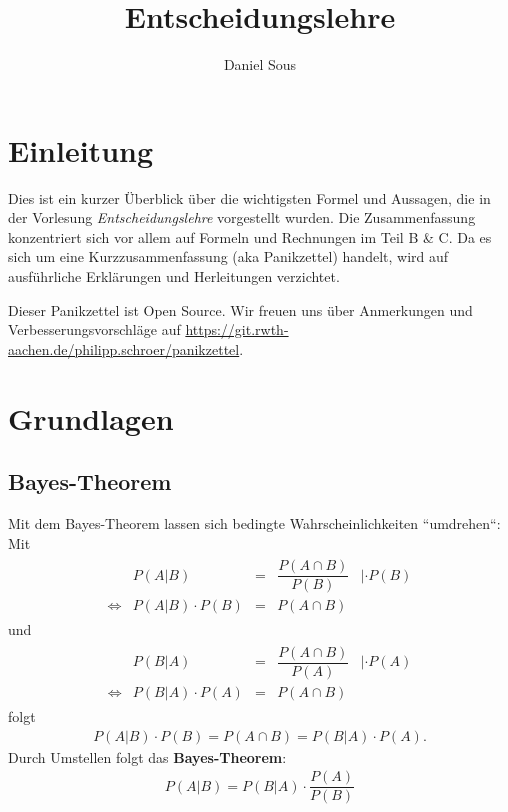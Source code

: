 \documentclass{panikzettel}
\title{Entscheidungslehre}
\author{Daniel Sous}
\begin{document}
\maketitle

\tableofcontents

\section{Einleitung}

Dies ist ein kurzer Überblick über die wichtigsten Formel und Aussagen, die in der Vorlesung \textit{Entscheidungslehre} \cite{vonNitzsch:skript} vorgestellt wurden. Die Zusammenfassung konzentriert sich vor allem auf Formeln und Rechnungen im Teil B \& C. Da es sich um eine Kurzzusammenfassung (aka Panikzettel) handelt, wird auf ausführliche Erklärungen und Herleitungen verzichtet.

Dieser Panikzettel ist Open Source.
Wir freuen uns über Anmerkungen und Verbesserungsvorschläge auf \url{https://git.rwth-aachen.de/philipp.schroer/panikzettel}.

\section{Grundlagen}

\subsection{Bayes-Theorem}
Mit dem Bayes-Theorem lassen sich bedingte Wahrscheinlichkeiten ``umdrehen``:\\
Mit
\begin{align*}
\begin{array}{rrcll}
& P(A | B) & =  & \dfrac{P(A \cap B)}{P(B)} & |\cdot P(B) \\
\Leftrightarrow & P (A|B) \cdot P(B) & = & P(A \cap B)
\end{array}
\end{align*}
und
\begin{align*}
\begin{array}{rrcll}
& P(B | A) & =  & \dfrac{P(A \cap B)}{P(A)} & |\cdot P(A) \\
\Leftrightarrow & P (B|A) \cdot P(A) & = & P(A \cap B)
\end{array}
\end{align*}
folgt
\begin{align*}
	P (A|B) \cdot P(B) = P(A \cap B) = P (B|A) \cdot P(A).
\end{align*}
Durch Umstellen folgt das \textbf{Bayes-Theorem}:
\begin{align*}
	P(A|B) = P(B|A) \cdot \dfrac{P(A)}{P(B)}
\end{align*}
\end{document}
